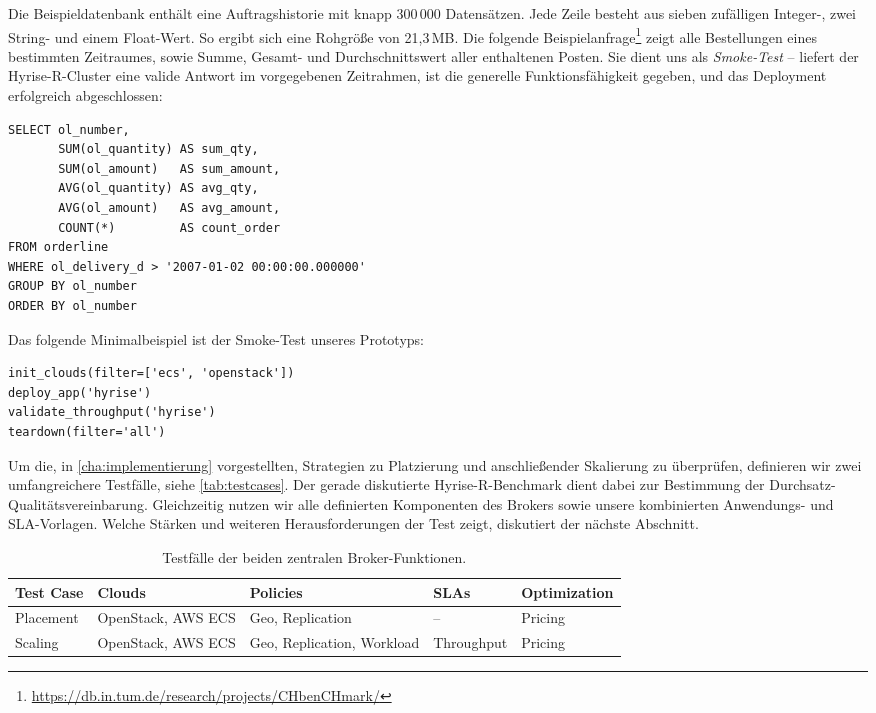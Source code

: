 Die Beispieldatenbank enthält eine Auftragshistorie mit knapp 300\,000 Datensätzen. Jede Zeile besteht aus sieben zufälligen Integer-, zwei String- und einem Float-Wert. So ergibt sich eine Rohgröße von 21,3\,MB. Die folgende Beispielanfrage\footnote{\url{https://db.in.tum.de/research/projects/CHbenCHmark/}} zeigt alle Bestellungen eines bestimmten Zeitraumes, sowie Summe, Gesamt- und Durchschnittswert aller enthaltenen Posten. Sie dient uns als \emph{Smoke-Test} -- liefert der Hyrise-R-Cluster eine valide Antwort im vorgegebenen Zeitrahmen, ist die generelle Funktionsfähigkeit gegeben, und das Deployment erfolgreich abgeschlossen:

\begin{verbatim}
SELECT ol_number,
       SUM(ol_quantity) AS sum_qty,
       SUM(ol_amount)   AS sum_amount,
       AVG(ol_quantity) AS avg_qty,
       AVG(ol_amount)   AS avg_amount,
       COUNT(*)         AS count_order
FROM orderline 
WHERE ol_delivery_d > '2007-01-02 00:00:00.000000' 
GROUP BY ol_number
ORDER BY ol_number
\end{verbatim}

Das folgende Minimalbeispiel ist der Smoke-Test unseres Prototyps:

\begin{verbatim}
init_clouds(filter=['ecs', 'openstack'])
deploy_app('hyrise')
validate_throughput('hyrise')
teardown(filter='all')
\end{verbatim}

Um die, in \autoref{cha:implementierung} vorgestellten, Strategien zu Platzierung und anschließender Skalierung zu überprüfen, definieren wir zwei umfangreichere Testfälle, siehe \autoref{tab:testcases}. Der gerade diskutierte Hyrise-R-Benchmark dient dabei zur Bestimmung der Durchsatz-Qualitätsvereinbarung. Gleichzeitig nutzen wir alle definierten Komponenten des Brokers sowie unsere kombinierten Anwendungs- und SLA-Vorlagen.  Welche Stärken und weiteren Herausforderungen der Test zeigt, diskutiert der nächste Abschnitt.

\begin{table}[h!]
\centering%
%
\caption{Testfälle der beiden zentralen Broker-Funktionen.}%
\begin{tabularx}{\textwidth}{LLLLL}%
\toprule%
%
Test Case & Clouds & Policies & SLAs & Optimization\\%
%
\midrule%
%
Placement & OpenStack, AWS ECS & Geo, Replication & -- & Pricing\\%
Scaling   & OpenStack, AWS ECS & Geo, Replication, Workload & Throughput & Pricing\\%
\bottomrule%
\end{tabularx}
\label{tab:testcases}
\end{table}
